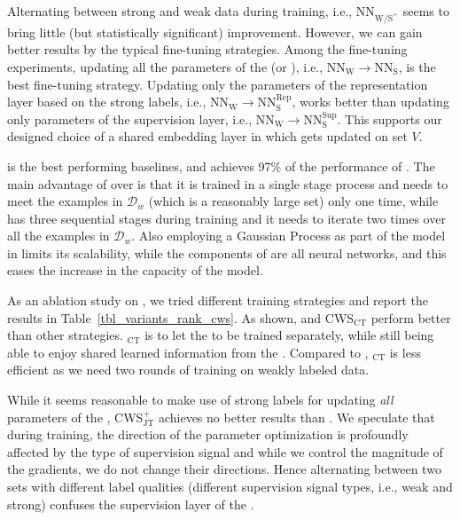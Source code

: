 Alternating between strong and weak data during training, i.e., $\text{NN}_{\text{W}\text{/S}^+}$ seems to bring little (but statistically significant) improvement. However, we can gain better results by the typical fine-tuning strategies.  Among the fine-tuning experiments, updating all the parameters of the \tnet (or \std), i.e., $\text{NN}_{\text{W}} \to \text{NN}_{\text{S}}$, is the best fine-tuning strategy. Updating only the parameters of the representation layer based on the strong labels, i.e., $\text{NN}_{\text{W}} \to \text{NN}^{\text{Rep}}_{\text{S}}$, works better than updating only parameters of the supervision layer, i.e., $\text{NN}_{\text{W}} \to \text{NN}^{\text{Sup}}_{\text{S}}$. This supports our designed choice of a shared embedding layer in \cws which gets updated on set $V$.

\fwl is the best performing baselines, and \cws achieves 97\% of the performance of \fwl. The main advantage of \cws over \fwl is that it is trained in a single stage process and needs to meet the examples in $\mathcal{D}_w$ (which is a reasonably large set) only one time, while \fwl has three sequential stages during training and it needs to iterate two times over all the examples in $\mathcal{D}_w$. Also employing a Gaussian Process as part of the model in \fwl limits its scalability, while the components of \cws are all neural networks, and this eases the increase in the capacity of the model. 



As an ablation study on \cws, we tried different training strategies and report the results in Table~\ref{tbl_variants_rank_cws}. As shown, \cws and CWS$_\text{CT}$ perform better than other strategies.
%
\cws$_\text{CT}$ is to let the \cnet to be trained separately, while still being able to enjoy shared learned information from the \tnet. Compared to \cws, \cws$_\text{CT}$ is less efficient as we need two rounds of training on weakly labeled data. 

While it seems reasonable to make use of strong labels for updating \emph{all} parameters of the \tnet, CWS$_\text{JT}^+$ achieves no better results than \cws. We speculate that during training, the direction of the parameter optimization is profoundly affected by the type of supervision signal and while we control the magnitude of the gradients, we do not change their directions. Hence alternating between two sets with different label qualities (different supervision signal types, i.e., weak and strong) confuses the supervision layer of the \tnet. 


